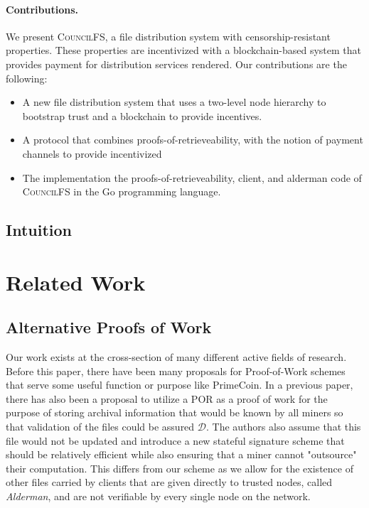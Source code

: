 \documentclass{article}
\begin{document}
\paragraph{Contributions.} We present \textsc{CouncilFS}, a file distribution
system with censorship-resistant properties. These properties are incentivized
with a blockchain-based system that provides payment for distribution services
rendered. Our contributions are the following:
\begin{itemize}
\item A new file distribution system that uses a two-level node hierarchy to
  bootstrap trust and a blockchain to provide incentives.
\item A protocol that combines proofs-of-retrieveability, with the
  notion of payment channels to provide incentivized 
\item The implementation the proofs-of-retrieveability, client, and alderman
  code of \textsc{CouncilFS} in the Go programming language.
\end{itemize}

\subsection{Intuition}


\section{Related Work}
\subsection{Alternative Proofs of Work}
Our work exists at the cross-section of many different active fields of research. Before this paper, there have been many proposals for Proof-of-Work schemes that serve some useful function or purpose like PrimeCoin. In a previous paper, there has also been a proposal to utilize a POR as a proof of work for the purpose of storing archival information that would be known by all miners so that validation of the files could be assured $\mathcal{D}$. The authors also assume that this file would not be updated and introduce a new stateful signature scheme that should be relatively efficient while also ensuring that a miner cannot "outsource" their computation. This differs from our scheme as we allow for the existence of other files carried by clients that are given directly to trusted nodes, called \emph{Alderman}, and are not verifiable by every single node on the network.\\
\end{document}
